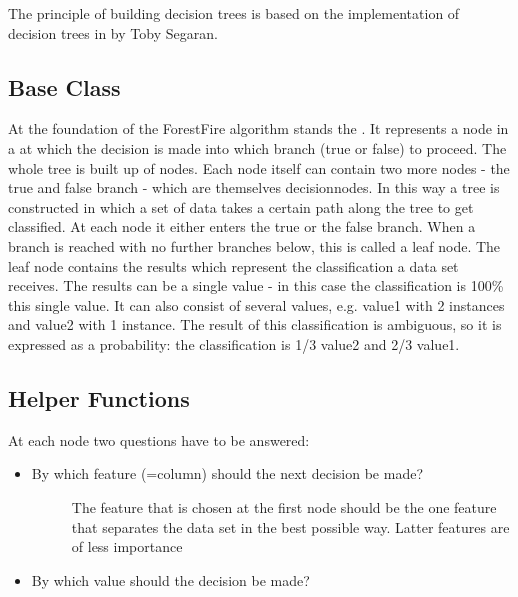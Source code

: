 \documentclass[letterpaper,10pt,english]{sphinxmanual}
\begin{document}
The principle of building decision trees is based on the implementation of decision trees in \label{\detokenize{DT:id1}}{\hyperref[\detokenize{Overview:collective-intelligence}]{}} by Toby Segaran.


\subsection{Base Class}
\label{\detokenize{DT:base-class}}
At the foundation of the ForestFire algorithm stands the {\hyperref[\detokenize{DT:decisionnode}]{}}.
It represents a node in a {\hyperref[\detokenize{Overview:term-decision-tree}]{}} at which the decision is made into which branch (true or false) to proceed.
The whole tree is built up of nodes.
Each node itself can contain two more nodes - the true and false branch - which are themselves decisionnodes.
In this way a tree is constructed in which a set of data takes a certain path along the tree to get classified.
At each node it either enters the true or the false branch.
When a branch is reached with no further branches below, this is called a leaf node.
The leaf node contains the results which represent the classification a data set receives.
The results can be a single value - in this case the classification is 100\% this single value.
It can also consist of several values, e.g. value1 with 2 instances and value2 with 1 instance.
The result of this classification is ambiguous, so it is expressed as a probability: the classification is 1/3 value2 and 2/3 value1.


\subsection{Helper Functions}
\label{\detokenize{DT:helper-functions}}\label{\detokenize{DT:help}}
At each node two questions have to be answered:
\begin{itemize}
\item {} \begin{description}
\item[{By which feature (=column) should the next decision be made?}] \leavevmode
The feature that is chosen at the first node should be the one feature that separates the data set in the best possible way. Latter features are of less importance

\end{description}

\item {} 
By which value should the decision be made?

\end{itemize}
\end{document}
